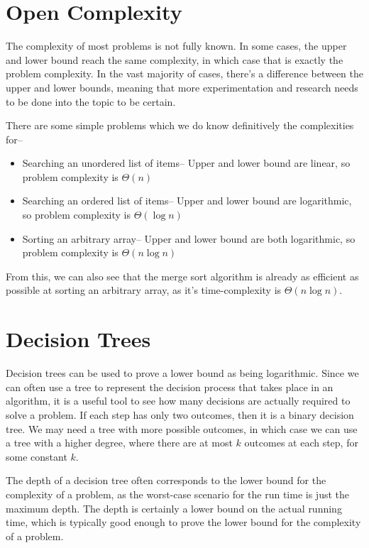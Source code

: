 \section*{Open Complexity}

The complexity of most problems is not fully known. In some cases, the upper and lower bound reach the same complexity,
 in which case that is exactly the problem complexity. In the vast majority of cases, there's a difference between the
 upper and lower bounds, meaning that more experimentation and research needs to be done into the topic to be certain.

There are some simple problems which we do know definitively the complexities for--
\begin{itemize}
  \item Searching an unordered list of items-- Upper and lower bound are linear, so problem complexity is $\Theta(n)$
  \item Searching an ordered list of items-- Upper and lower bound are logarithmic, so problem complexity is
   $\Theta(\log n)$
  \item Sorting an arbitrary array-- Upper and lower bound are both logarithmic, so problem complexity is
   $\Theta(n \log n)$
\end{itemize}

From this, we can also see that the merge sort algorithm is already as efficient as possible at sorting an arbitrary
 array, as it's time-complexity is $\Theta(n \log n)$.

\section*{Decision Trees}

Decision trees can be used to prove a lower bound as being logarithmic. Since we can often use a tree to represent the
 decision process that takes place in an algorithm, it is a useful tool to see how many decisions are actually required
 to solve a problem. If each step has only two outcomes, then it is a binary decision tree. We may need a tree with
 more possible outcomes, in which case we can use a tree with a higher degree, where there are at most $k$ outcomes
 at each step, for some constant $k$.

The depth of a decision tree often corresponds to the lower bound for the complexity of a problem, as the worst-case
 scenario for the run time is just the maximum depth. The depth is certainly a lower bound on the actual running time,
 which is typically good enough to prove the lower bound for the complexity of a problem.

